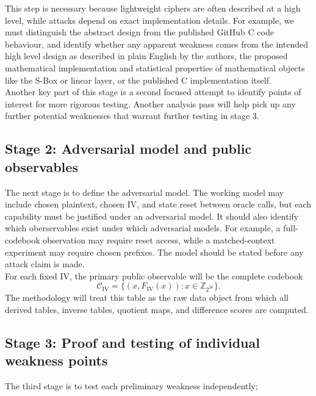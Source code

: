 \documentclass[11pt]{article}
\newcommand{\Z}[1]{\mathbb{Z}_{#1}}
\begin{document}
This step is necessary because lightweight ciphers are often described at a high level, while attacks depend on exact implementation details. For example, we must distinguish the abstract design from the published GitHub C code behaviour, and identify whether any apparent weakness comes from the intended high level design as described in plain English by the authors, the proposed mathematical implementation and statistical properties of mathematical objects like the S-Box or linear layer, or the published C implementation itself.\\

Another key part of this stage is a second focused attempt to identify points of interest for more rigorous testing. Another analysis pass will help pick up any further potential weaknesses that warrant further testing in stage 3.

\subsection{Stage 2: Adversarial model and public observables}

The next stage is to define the adversarial model. The working model may include chosen plaintext, chosen IV, and state reset between oracle calls, but each capability must be justified under an adversarial model. It should also identify which oberservables exist under which adversarial models. For example, a full-codebook observation may require reset access, while a matched-context experiment may require chosen prefixes. The model should be stated before any attack claim is made.\\

For each fixed IV, the primary public observable will be the complete codebook
\[
\mathcal{C}_{\mathrm{IV}}=\{(x,F_{\mathrm{IV}}(x)):x\in\Z{2^{16}}\}.
\]
The methodology will treat this table as the raw data object from which all derived tables, inverse tables, quotient maps, and difference scores are computed.

\subsection{Stage 3: Proof and testing of individual weakness points}

The third stage is to test each preliminary weakness independently;
\end{document}
